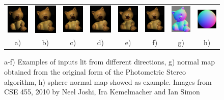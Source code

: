 \documentclass{report}
\begin{document}

\begin{figure}
\begin{tabular}{cccccc|cc}
\includegraphics[width=.1\linewidth]{PS/cat_0.png} &
\includegraphics[width=.1\linewidth]{PS/cat_3.png} &
\includegraphics[width=.1\linewidth]{PS/cat_4.png} &
\includegraphics[width=.1\linewidth]{PS/cat_5.png} &
\includegraphics[width=.1\linewidth]{PS/cat_10.png} &
\includegraphics[width=.1\linewidth]{PS/cat_11.png} &
\includegraphics[width=.1\linewidth]{PS/cat_normal_map.png} &
\includegraphics[width=.1\linewidth]{PS/sphere_nm.png} \\
a) & b) & c) & d) & e) & f) & g) & h)
\end{tabular}
\caption{a-f) Examples of inputs lit from different directions, g) normal map obtained from the original form of the Photometric Stereo algorithm, h) sphere normal map showed as example.\newline
{\small Images from CSE 455, 2010 by Neel Joshi, Ira Kemelmacher and Ian Simon}
}
\label{fig:PS_example}
\end{figure}
\end{document}
